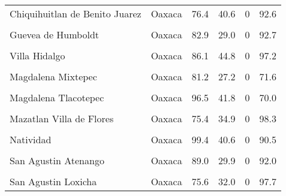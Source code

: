 \documentclass[
]{report}
\begin{document}
\begin{longtable}[t]{llrrrr}
Chiquihuitlan de Benito Juarez & Oaxaca & 76.4 & 40.6 & 0 & 92.6\\
\cellcolor{gray!6}{El Espinal} & \cellcolor{gray!6}{Oaxaca} & \cellcolor{gray!6}{97.9} & \cellcolor{gray!6}{48.0} & \cellcolor{gray!6}{0} & \cellcolor{gray!6}{75.3}\\
\addlinespace
Guevea de Humboldt & Oaxaca & 82.9 & 29.0 & 0 & 92.7\\
\cellcolor{gray!6}{Mesones Hidalgo} & \cellcolor{gray!6}{Oaxaca} & \cellcolor{gray!6}{80.2} & \cellcolor{gray!6}{28.1} & \cellcolor{gray!6}{0} & \cellcolor{gray!6}{66.1}\\
Villa Hidalgo & Oaxaca & 86.1 & 44.8 & 0 & 97.2\\
\cellcolor{gray!6}{Magdalena Jaltepec} & \cellcolor{gray!6}{Oaxaca} & \cellcolor{gray!6}{96.6} & \cellcolor{gray!6}{25.4} & \cellcolor{gray!6}{0} & \cellcolor{gray!6}{64.4}\\
Magdalena Mixtepec & Oaxaca & 81.2 & 27.2 & 0 & 71.6\\
\addlinespace
\cellcolor{gray!6}{Magdalena Tequisistlan} & \cellcolor{gray!6}{Oaxaca} & \cellcolor{gray!6}{97.4} & \cellcolor{gray!6}{39.1} & \cellcolor{gray!6}{0} & \cellcolor{gray!6}{75.3}\\
Magdalena Tlacotepec & Oaxaca & 96.5 & 41.8 & 0 & 70.0\\
\cellcolor{gray!6}{Magdalena Zahuatlan} & \cellcolor{gray!6}{Oaxaca} & \cellcolor{gray!6}{97.8} & \cellcolor{gray!6}{28.9} & \cellcolor{gray!6}{0} & \cellcolor{gray!6}{60.9}\\
Mazatlan Villa de Flores & Oaxaca & 75.4 & 34.9 & 0 & 98.3\\
\cellcolor{gray!6}{Mixistlan de la Reforma} & \cellcolor{gray!6}{Oaxaca} & \cellcolor{gray!6}{88.8} & \cellcolor{gray!6}{43.2} & \cellcolor{gray!6}{0} & \cellcolor{gray!6}{100.0}\\
\addlinespace
Natividad & Oaxaca & 99.4 & 40.6 & 0 & 90.5\\
\cellcolor{gray!6}{Pinotepa de Don Luis} & \cellcolor{gray!6}{Oaxaca} & \cellcolor{gray!6}{90.3} & \cellcolor{gray!6}{46.5} & \cellcolor{gray!6}{0} & \cellcolor{gray!6}{92.3}\\
San Agustin Atenango & Oaxaca & 89.0 & 29.9 & 0 & 92.0\\
\cellcolor{gray!6}{San Agustin Chayuco} & \cellcolor{gray!6}{Oaxaca} & \cellcolor{gray!6}{92.2} & \cellcolor{gray!6}{38.4} & \cellcolor{gray!6}{0} & \cellcolor{gray!6}{77.3}\\
San Agustin Loxicha & Oaxaca & 75.6 & 32.0 & 0 & 97.7\\

\end{longtable}
\end{document}
